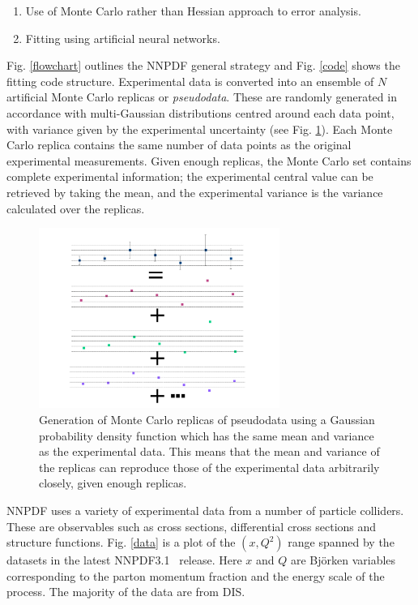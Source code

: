 \begin{enumerate}
\item  Use of Monte Carlo rather than Hessian approach to error analysis. 
    \item  Fitting using artificial neural networks.
\end{enumerate}

Fig. \ref{flowchart} outlines the NNPDF general strategy and Fig. \ref{code} shows the fitting code structure. Experimental data is converted into an ensemble of $N$ artificial Monte Carlo replicas or \textit{pseudodata}. These are randomly generated in accordance with multi-Gaussian distributions centred around each data point, with variance given by the experimental uncertainty (see Fig. \ref{MC}). Each Monte Carlo replica contains the same number of data points as the original experimental measurements. Given enough replicas, the Monte Carlo set contains complete experimental information; the experimental central value can be retrieved by taking the mean, and the experimental variance is the variance calculated over the replicas. 

\begin{figure}
\centering
\includegraphics[width=0.7\textwidth]{background/monte_carlo.pdf}
\caption{Generation of Monte Carlo replicas of pseudodata using a Gaussian probability density
  function which has the same mean and variance as the experimental data. This means that the
  mean and variance of the replicas can reproduce those of the experimental data arbitrarily
  closely, given enough replicas.}
\label{MC}
\end{figure}


NNPDF uses a variety of experimental data from a number of particle colliders. These are observables such as cross sections, differential cross sections and structure functions. Fig. \ref{data} is a plot of the $(x,Q^2)$ range spanned by the datasets in the latest NNPDF3.1~\cite{Ball:2017nwa} release. Here $x$ and $Q$ are Bj\"orken variables corresponding to the parton momentum fraction and the energy scale of the process. The majority of the data are from DIS.

